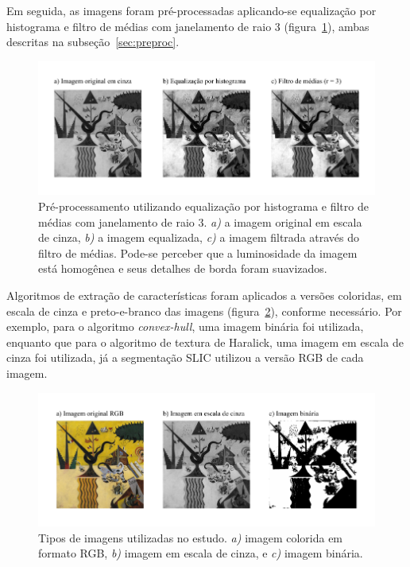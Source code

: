 Em seguida, as imagens foram pré-processadas aplicando-se equalização
por histograma e filtro de médias com janelamento de raio 3
(figura~\ref{fig:eq}), ambas descritas na subseção~\ref{sec:preproc}.

\begin{figure}[ht!]
\begin{center}
         \caption{Pré-processamento utilizando equalização por histograma
        e filtro de médias com janelamento de raio 3. \textit{a)} a
        imagem original em escala de cinza, \textit{b)} a imagem
        equalizada, \textit{c)} a imagem filtrada através do filtro de
        médias. Pode-se perceber que a luminosidade da imagem está
        homogênea e seus detalhes de borda foram suavizados.}
        \label{fig:eq}
        \includegraphics[scale=1.2]{figs/passos_eq}
     \fonteminha
\end{center}
\end{figure}

Algoritmos de extração de características foram aplicados a versões
coloridas, em escala de cinza e preto-e-branco das imagens
(figura~\ref{fig:tipos}), conforme necessário. Por exemplo, para o algoritmo
\textit{convex-hull}, uma imagem binária foi utilizada, enquanto que para o
algoritmo de textura de Haralick, uma imagem em escala de cinza foi
utilizada, já a segmentação SLIC utilizou a versão RGB de cada
imagem.

\begin{figure}[ht!]
\begin{center}
         \caption{Tipos de imagens utilizadas no estudo. \textit{a)}
        imagem colorida em formato RGB, \textit{b)} imagem em
        escala de cinza, e \textit{c)} imagem binária.}
        \label{fig:tipos}
        \includegraphics[scale=1.2]{figs/passos_tipos}
       \fonteminha
\end{center}
\end{figure}


